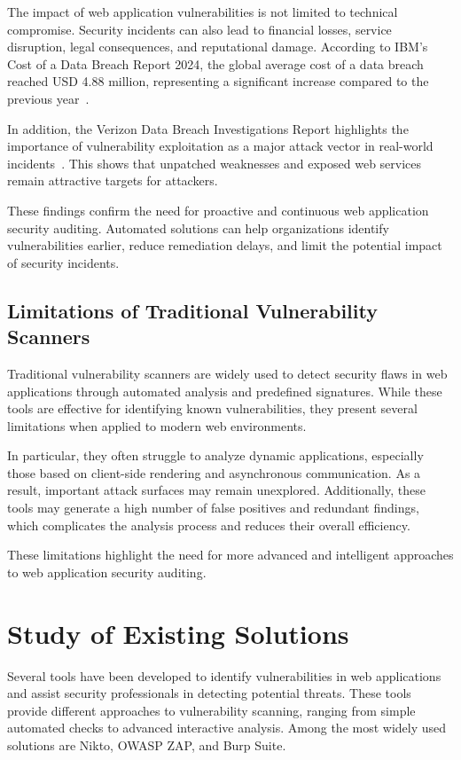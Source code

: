 \indent The impact of web application vulnerabilities is not limited to technical compromise. Security incidents can also lead to financial losses, service disruption, legal consequences, and reputational damage. According to IBM's Cost of a Data Breach Report 2024, the global average cost of a data breach reached USD 4.88 million, representing a significant increase compared to the previous year~\cite{ibm_breach_2024}.

\indent In addition, the Verizon Data Breach Investigations Report highlights the importance of vulnerability exploitation as a major attack vector in real-world incidents~\cite{verizon_dbir_2024}. This shows that unpatched weaknesses and exposed web services remain attractive targets for attackers.

\indent These findings confirm the need for proactive and continuous web application security auditing. Automated solutions can help organizations identify vulnerabilities earlier, reduce remediation delays, and limit the potential impact of security incidents.

\subsection{Limitations of Traditional Vulnerability Scanners}

\indent Traditional vulnerability scanners are widely used to detect security flaws in web applications through automated analysis and predefined signatures. While these tools are effective for identifying known vulnerabilities, they present several limitations when applied to modern web environments.

\indent In particular, they often struggle to analyze dynamic applications, especially those based on client-side rendering and asynchronous communication. As a result, important attack surfaces may remain unexplored. Additionally, these tools may generate a high number of false positives and redundant findings, which complicates the analysis process and reduces their overall efficiency.

\indent These limitations highlight the need for more advanced and intelligent approaches to web application security auditing.

\section{Study of Existing Solutions}

\indent Several tools have been developed to identify vulnerabilities in web applications and assist security professionals in detecting potential threats. These tools provide different approaches to vulnerability scanning, ranging from simple automated checks to advanced interactive analysis. Among the most widely used solutions are Nikto, OWASP ZAP, and Burp Suite.

